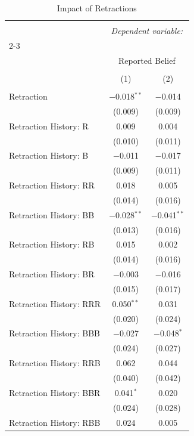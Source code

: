 
\begin{table}[!htbp] \centering 
  \caption{Impact of Retractions} 
  \label{} 
\begin{tabular}{@{\extracolsep{5pt}}lcc} 
\\[-1.8ex]\hline 
\hline \\[-1.8ex] 
 & \multicolumn{2}{c}{\textit{Dependent variable:}} \\ 
\cline{2-3} 
\\[-1.8ex] & \multicolumn{2}{c}{Reported Belief} \\ 
\\[-1.8ex] & (1) & (2)\\ 
\hline \\[-1.8ex] 
 Retraction & $-$0.018$^{**}$ & $-$0.014 \\ 
  & (0.009) & (0.009) \\ 
  Retraction History: R & 0.009 & 0.004 \\ 
  & (0.010) & (0.011) \\ 
  Retraction History: B & $-$0.011 & $-$0.017 \\ 
  & (0.009) & (0.011) \\ 
  Retraction History: RR & 0.018 & 0.005 \\ 
  & (0.014) & (0.016) \\ 
  Retraction History: BB & $-$0.028$^{**}$ & $-$0.041$^{**}$ \\ 
  & (0.013) & (0.016) \\ 
  Retraction History: RB & 0.015 & 0.002 \\ 
  & (0.014) & (0.016) \\ 
  Retraction History: BR & $-$0.003 & $-$0.016 \\ 
  & (0.015) & (0.017) \\ 
  Retraction History: RRR & 0.050$^{**}$ & 0.031 \\ 
  & (0.020) & (0.024) \\ 
  Retraction History: BBB & $-$0.027 & $-$0.048$^{*}$ \\ 
  & (0.024) & (0.027) \\ 
  Retraction History: RRB & 0.062 & 0.044 \\ 
  & (0.040) & (0.042) \\ 
  Retraction History: BBR & 0.041$^{*}$ & 0.020 \\ 
  & (0.024) & (0.028) \\ 
  Retraction History: RBB & 0.024 & 0.005 \\ 

\end{tabular}
\end{table}
